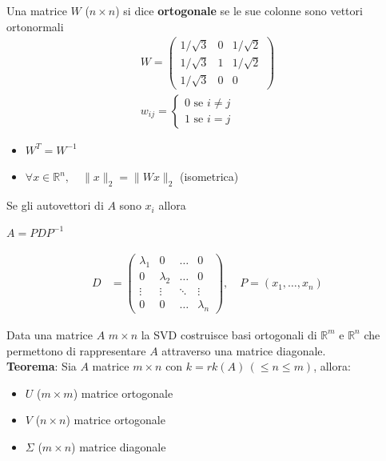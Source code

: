 \documentclass[a4paper,12pt]{article}
\begin{document}
\begin{tcolorbox}[colback=blue!5!white, colframe=blue!75!black]
Una matrice $W$ ($n \times n$) si dice \textbf{ortogonale} se le sue colonne sono vettori ortonormali
\begin{align*}
    W = \begin{pmatrix}
        1/\sqrt{3} & 0 & 1/\sqrt{2} \\
        1/\sqrt{3} & 1 & 1/\sqrt{2} \\
        1/\sqrt{3} & 0 & 0
    \end{pmatrix} \\
    w_{ij} = \begin{cases}
        0 \text{ se }i \neq j \\
        1 \text{ se }i=j
    \end{cases}
\end{align*}
\begin{itemize}
    \item $\boxed{W^T = W^{-1}}$ \\
    \item $\forall x \in \mathbb{R}^n, \quad \| x \|_2 = \| Wx \|_2$ (isometrica)
\end{itemize}
\end{tcolorbox}
\begin{tcolorbox}[colback=orange!5!white, colframe=orange!75!black, title=Teorema di diagonalizzazione]
Se gli autovettori di $A$ sono $x_i$ allora 
\begin{center}
    $A = PDP^{-1}$
\end{center}
\begin{align*}
    D &= \begin{pmatrix}
        \lambda_1 & 0 & \dots & 0 \\
        0 & \lambda_2 & \dots & 0 \\
        \vdots & \vdots & \ddots & \vdots \\
        0 & 0 & \dots & \lambda_n
    \end{pmatrix}, \quad 
    P = (x_1, \dots, x_n)
\end{align*}
\end{tcolorbox}
Data una matrice $A$ $m\times n$ la SVD costruisce basi ortogonali di $\mathbb{R}^m$ e $\mathbb{R}^n$ che permettono di rappresentare $A$ attraverso una matrice diagonale. \\
\label{sec:svd}
\textbf{Teorema}: Sia $A$ matrice $m \times n$ con $k=rk(A) \, (\leq n \leq m)$, allora:
\begin{itemize}
    \item $U$ ($m \times m$) matrice ortogonale
    \item $V$ ($n \times n$) matrice ortogonale
    \item $\Sigma$ ($m \times n$) matrice diagonale
\end{itemize}
\end{document}
